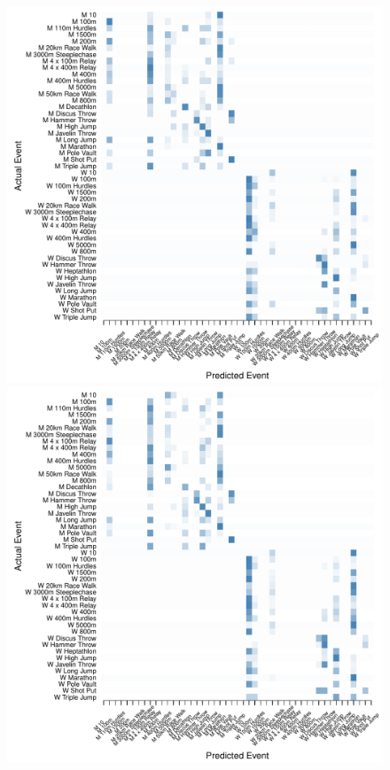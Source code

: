 \begin{figure}
\begin{center}
\begin{minipage}{0.20\textwidth}
\begin{center}
    \end{center}
  \end{minipage}
  \hspace{0.05\textwidth}
    \begin{minipage}{0.20\textwidth}
    \begin{center}
      \includegraphics[scale=0.20]{../graphics/athletesEV-trn.pdf}
    \end{center}
  \end{minipage}
  \hspace{0.05\textwidth}
  \begin{minipage}{0.20\textwidth}
    \begin{center}
      \includegraphics[scale=0.20]{../graphics/athletesEV-tst.pdf}

\end{center}
\end{minipage}
\end{center}
\end{figure}
